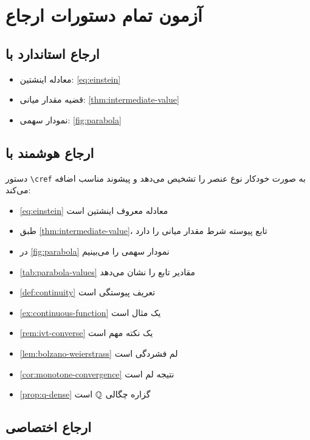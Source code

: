 \documentclass{matinbook}
\begin{document}
\chapter{آزمون تمام دستورات ارجاع}
\label{chap:references}

\section{ارجاع استاندارد با }

\begin{itemize}
    \item معادله اینشتین: \ref{eq:einstein}
    \item قضیه مقدار میانی: \ref{thm:intermediate-value}
    \item نمودار سهمی: \ref{fig:parabola}
\end{itemize}

\section{ارجاع هوشمند با }

دستور \texttt{\textbackslash cref} به صورت خودکار
نوع عنصر را تشخیص می‌دهد و پیشوند مناسب اضافه می‌کند:

\begin{itemize}
    \item \cref{eq:einstein} معادله معروف اینشتین است
    \item طبق \cref{thm:intermediate-value}، تابع پیوسته
    شرط مقدار میانی را دارد
    \item در \cref{fig:parabola} نمودار سهمی را می‌بینیم
    \item \cref{tab:parabola-values} مقادیر تابع را نشان می‌دهد
    \item \cref{def:continuity} تعریف پیوستگی است
    \item \cref{ex:continuous-function} یک مثال است
    \item \cref{rem:ivt-converse} یک نکته مهم است
    \item \cref{lem:bolzano-weierstrass} لم فشردگی است
    \item \cref{cor:monotone-convergence} نتیجه لم است
    \item \cref{prop:q-dense} گزاره چگالی $\mathbb{Q}$ است
\end{itemize}

\section{ارجاع اختصاصی }
\end{document}
